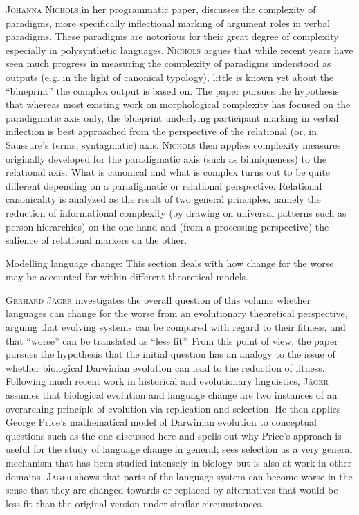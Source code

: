 \documentclass[output=paper,colorlinks,citecolor=brown]{langscibook}
\begin{document}
\textsc{Johanna Nichols},in her programmatic paper, discusses the complexity of paradigms, more specifically inflectional marking of argument roles in verbal paradigms. These paradigms are notorious for their great degree of complexity especially in polysynthetic languages. \textsc{Nichols} argues that while recent years have seen much progress in measuring the complexity of paradigms understood as outputs (e.g. in the light of canonical typology), little is known yet about the ``blueprint'' the complex output is based on. The paper pursues the hypothesis that whereas most existing work on morphological complexity has focused on the paradigmatic axis only, the blueprint underlying participant marking in verbal inflection is best approached from the perspective of the relational (or, in Saussure's terms, syntagmatic) axis. \textsc{Nichols} then applies complexity measures originally developed for the paradigmatic axis (such as biuniqueness) to the relational axis. What is canonical and what is complex turns out to be quite different depending on a paradigmatic or relational perspective. Relational canonicality is analyzed as the result of two general principles, namely the reduction of informational complexity (by drawing on universal patterns such as person hierarchies) on the one hand and (from a processing perspective) the salience of relational markers on the other.

Modelling language change: This section deals with how change for the worse may be accounted for within different theoretical models.

\textsc{Gerhard Jäger} investigates the overall question of this volume whether languages can change for the worse from an evolutionary theoretical perspective, arguing that evolving systems can be compared with regard to their fitness, and that “worse” can be translated as “less fit”. From this point of view, the paper pursues the hypothesis that the initial question has an analogy to the issue of whether biological Darwinian evolution can lead to the reduction of fitness. Following much recent work in historical and evolutionary linguistics, \textsc{Jäger} assumes that biological evolution and language change are two instances of an overarching principle of evolution via replication and selection. He then applies George Price’s mathematical model of Darwinian evolution to conceptual questions such as the one discussed here and spells out why Price’s approach is useful for the study of language change in general; \citet{Price_1995} sees selection as a very general mechanism that has been studied intensely in biology but is also at work in other domains. \textsc{Jäger} shows that parts of the language system can become worse in the sense that they are changed towards or replaced by alternatives that would be less fit than the original version under similar circumstances.
\end{document}
